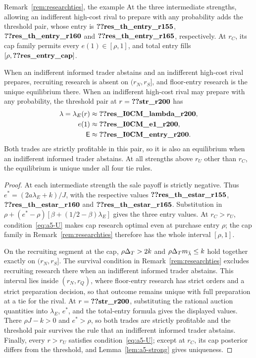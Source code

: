 \begin{named}{Remark~\ref{rem:researchties}, the example}
At the three intermediate strengths, allowing an indifferent high-cost rival to prepare with any probability
adds the threshold pair, whose entry is \(\reg{res_th_entry_r155}\), \(\reg{res_th_entry_r160}\) and
\(\reg{res_th_entry_r165}\), respectively. At \(r_C\), its cap family permits every \(e(1)\in[\rho,1]\), and
total entry fills \([\rho,\reg{res_entry_cap}]\).

When an indifferent informed trader abstains and an indifferent high-cost rival prepares, recruiting research is
absent on \((r_N,r_S]\), and floor-entry research is the unique equilibrium there. When an indifferent high-cost
rival may prepare with any probability, the threshold pair at \(r=\reg{str_r200}\) has
\[
 \begin{aligned}\lambda=\lambda_E(r)&\approx\reg{res_I0CM_lambda_r200},\\
 e(1)&\approx\reg{res_I0CM_e1_r200},\\
 \Ent&\approx\reg{res_I0CM_entry_r200}.\end{aligned}
\]
Both trades are strictly profitable in this pair, so it is also an equilibrium when an indifferent informed trader
abstains. At all strengths above \(r_U\) other than \(r_C\), the equilibrium is unique under all four tie rules.
\end{named}

\begin{proof}
At each intermediate strength the sale payoff is strictly negative. Thus
\(e^*=(2a\lambda_E+k)/J\), with the respective values
\(\reg{res_th_estar_r155}\), \(\reg{res_th_estar_r160}\) and \(\reg{res_th_estar_r165}\).
Substitution in \(\rho+(e^*-\rho)[\beta+(1/2-\beta)\lambda_E]\) gives the three entry values.
At \(r_C>r_U\), condition~\eqref{eq:a5-U} makes cap research optimal even at purchase entry \(\rho\);
the cap family in Remark~\ref{rem:researchties} therefore has the whole interval \([\rho,1]\).

On the recruiting segment at the cap, \(\rho\Delta_T>2k\) and \(\rho\Delta_T m_{\bar\lambda}\le k\) hold together exactly
on \((r_N,r_S]\). The survival condition in Remark~\ref{rem:researchties} excludes recruiting research
there when an indifferent informed trader abstains. This interval lies inside \((r_N,r_Q)\), where floor-entry
research has strict orders and a strict preparation decision, so that outcome remains unique with full
preparation at a tie for the rival. At \(r=\reg{str_r200}\), substituting the rational auction quantities into
\(\lambda_E\), \(e^*\), and the total-entry formula gives the displayed values.
There \(\rho J-k>0\) and \(e^*>\rho\), so both trades are strictly profitable and the threshold pair survives the rule that an indifferent informed trader abstains. Finally, every \(r>r_U\) satisfies condition~\eqref{eq:a5-U}; except at \(r_C\),
its cap posterior differs from the threshold, and Lemma~\ref{lem:a5-strong} gives uniqueness.
\end{proof}
